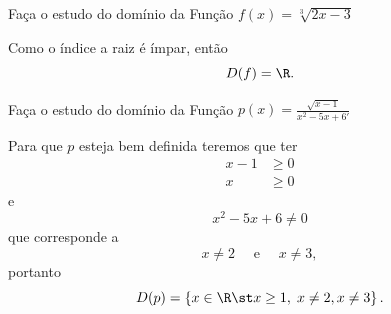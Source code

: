 \begin{example}
  Faça o estudo do domínio da Função
  \(
    f(x) = \sqrt[3]{2x-3}
  \)

  \solution
  Como o índice a raiz é ímpar, então
  \[
    D(f) = \R.
  \]
\end{example}

\begin{example}
  Faça o estudo do domínio da Função
  \(
    p(x) = \frac{\sqrt{x-1}}{x^2-5x+6'}
  \)

  \solution
  Para que $p$ esteja bem definida teremos que ter
  \begin{align*}
    x-1 & \geq 0 \\
    x   & \geq 0
  \end{align*}
  e
  \[
    x^2-5x+6 \neq 0
  \]
  que corresponde a
  \[
    x \neq 2 \quad\text{ e }\quad
    x \neq 3,
  \]
  portanto
  \[
    D(p) = \left\{ x \in \R \st x \geq 1,\; x \neq 2, x \neq 3 \right\}.
  \]
\end{example}
